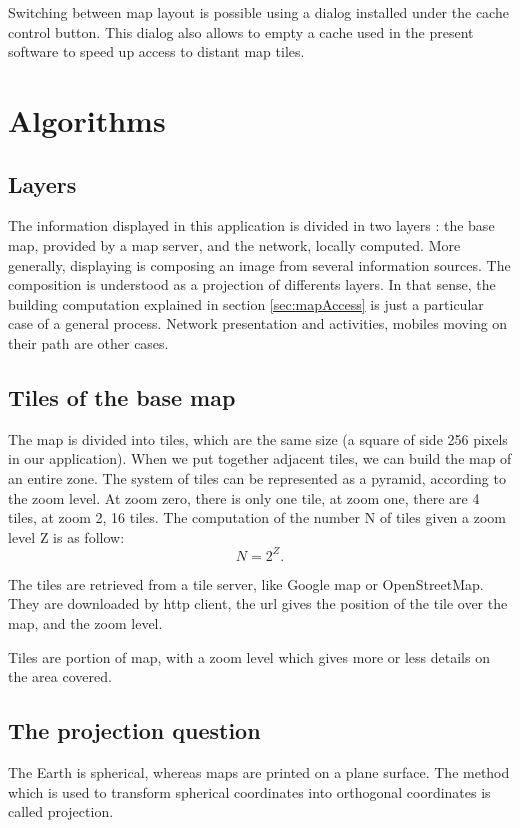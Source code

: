 Switching between map layout is possible using a dialog installed 
under the cache control button. This dialog also allows to empty a cache 
used in the present software to speed up access to distant map tiles. 


\section{Algorithms}

\subsection{Layers}

The information displayed in this application is divided in two layers : the base map, 
provided by a map server, and the network, locally computed. 
More generally, displaying is composing an image from several information sources. 
The composition is understood as a projection of differents layers. 
In that sense, the building computation explained in section \ref{sec:mapAccess}
is just a particular case of a general process. 
Network presentation and activities, mobiles moving on their path are other cases.

\subsection{Tiles of the base map}

The map is divided into tiles, which are the same size 
(a square of side 256 pixels in our application). 
When we put together adjacent tiles, we can build the map of an entire zone. 
The system of tiles can be represented as a pyramid, according to the zoom level. 
At zoom zero, there is only one tile, at zoom one, there are 4 tiles, 
at zoom 2, 16 tiles. 
The computation of the number N of tiles given a zoom level Z is as follow: 
\[N = 2 ^ Z .\] 
 
The tiles are retrieved from a tile server, like Google map or OpenStreetMap. 
They are downloaded by http client, the url gives the position of the tile over 
the map, and the zoom level. 

Tiles are portion of map, with a zoom level 
which gives more or less details on the area covered. 

\subsection{The projection question}

The Earth is spherical, whereas maps are printed on a plane surface. 
The method which is used to transform spherical coordinates into orthogonal coordinates 
is called projection. 


